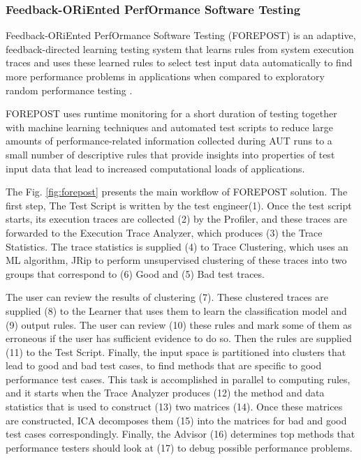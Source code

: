 \documentclass{report}
\begin{document}
\subsubsection{Feedback-ORiEnted PerfOrmance Software Testing}

Feedback-ORiEnted PerfOrmance Software Testing (FOREPOST) is an adaptive, feedback-directed learning testing system that learns rules from system execution traces and uses these learned rules to select test input data automatically to find more performance problems in applications when compared to exploratory random performance testing \cite{Grechanik2012}.

FOREPOST uses runtime monitoring for a short duration of testing together with machine learning techniques and automated test scripts to reduce large amounts of performance-related information collected during AUT runs to a small number of descriptive rules that provide insights into properties of test input data that lead to increased computational loads of applications.

The Fig. \ref{fig:forepost} presents the main workflow of FOREPOST solution. The first step,  The Test Script is written  by the test engineer(1). Once the test script starts, its execution traces are collected (2) by the Profiler, and these traces are forwarded to the Execution Trace Analyzer, which produces (3) the Trace Statistics. The trace statistics is supplied (4) to Trace Clustering, which uses an ML algorithm, JRip to perform unsupervised clustering of these traces into two groups that correspond to (6) Good and (5) Bad test traces. 

The user can review the results of clustering (7). These clustered traces are supplied (8) to the Learner that uses them to learn the classification model and (9) output rules. The user can review (10) these rules and mark some of them as erroneous if the user has sufficient evidence to do so. Then the rules are supplied (11) to the Test Script. Finally, the input space is partitioned into clusters that lead to good and bad test cases, to find methods that are specific to good performance test cases. This task is accomplished in parallel to computing rules, and it starts when the Trace Analyzer produces (12) the method and data statistics that is used to construct (13) two matrices (14). Once these matrices are constructed, ICA decomposes them (15) into the matrices for bad and good test cases correspondingly. Finally, the Advisor (16) determines top methods that performance testers should look at (17) to debug possible performance problems.
\end{document}
